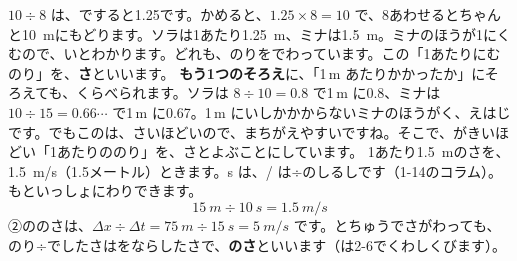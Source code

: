 $10\div8$ は、ですると1.25です。かめると、$1.25\times8=10$ で、8あわせるとちゃんと\qty{10}{m}にもどります。ソラは1あたり\qty{1.25}{m}、ミナは\qty{1.5}{m}。ミナのほうが1にくむので、いとわかります。どれも、のりをでわっています。この「1あたりにむのり」を、\textbf{さ}といいます。
\textbf{もう1つのそろえ}\quad {}に、「1\,m あたりかかったか」にそろえても、くらべられます。ソラは $8\div10=0.8$ で1\,m に0.8、ミナは $10\div15=0.66\cdots$ で1\,m に0.67。1\,m にいしかかからないミナのほうがく、えはじです。でもこのは、さいほどいので、まちがえやすいですね。そこで、がきいほどい「1あたりののり」を、さとよぶことにしています。
1あたり\qty{1.5}{m}のさを、\qty{1.5}{m/s}（1.5メートル）ときます。s は、/ は÷のしるしです（1-14のコラム）。もといっしょにわりできます。
\[ \qty{15}{m}\div\qty{10}{s}=\qty{1.5}{m/s} \]
②ののさは、$\Delta x\div\Delta t=\qty{75}{m}\div\qty{15}{s}=\qty{5}{m/s}$ です。とちゅうでさがわっても、のり÷でしたさはをならしたさで、\textbf{のさ}といいます（は2-6でくわしくびます）。

